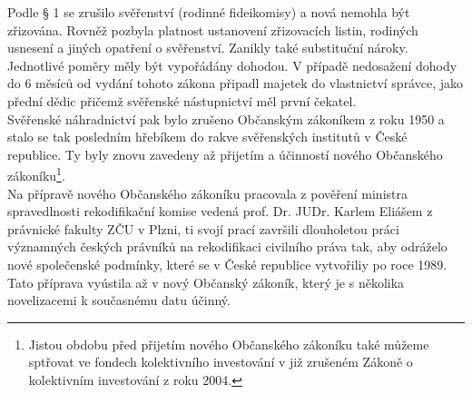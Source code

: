\documentclass{article}
\begin{document}
Podle § 1 se zrušilo svěřenství (rodinné fideikomisy) a nová nemohla být zřizována. Rovněž pozbyla platnost ustanovení zřizovacích listin, rodiných usnesení a jiných opatření o svěřenství. Zanikly také substituční nároky. Jednotlivé poměry měly být vypořádány dohodou. V případě nedosažení dohody do 6 měsíců od vydání tohoto zákona připadl majetek do vlastnictví správce, jako přední dědic přičemž svěřenské nástupnictví měl první čekatel.\\

Svěřenské náhradnictví pak bylo zrušeno Občanským zákoníkem z roku 1950 a stalo se tak posledním hřebíkem do rakve svěřenských institutů v České republice. Ty byly znovu zavedeny až přijetím a účinností nového Občanského zákoníku\footnote{Jistou obdobu před přijetím nového Občanského zákoníku také můžeme sptřovat ve fondech kolektivního investování v již zrušeném Zákoně o kolektivním investování z roku 2004.}.\\

Na přípravě nového Občanského zákoníku pracovala z pověření ministra spravedlnosti rekodifikační komise vedená prof. Dr. JUDr. Karlem Eliášem z právnické fakulty ZČU v Plzni, ti svojí prací završili dlouholetou práci významných českých právníků na rekodifikaci civilního práva tak, aby odráželo nové společenské podmínky, které se v České republice vytvořiliy po roce 1989. Tato příprava vyústila až v nový Občanský zákoník, který je s několika novelizacemi k současnému datu účinný.\\





\end{document}
